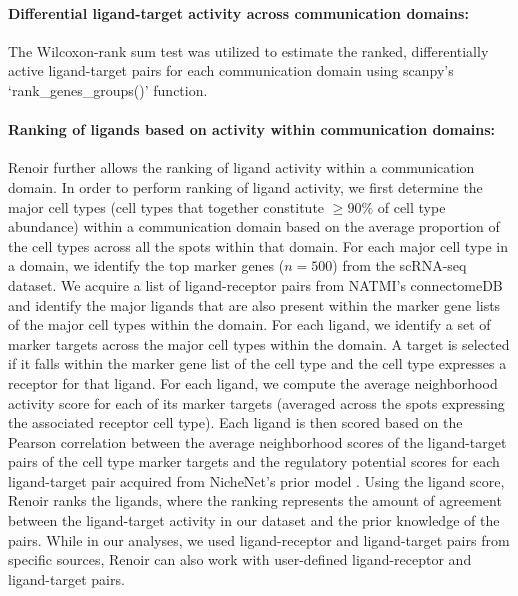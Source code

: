 \paragraph{Differential ligand-target activity across communication domains:} The Wilcoxon-rank sum test was utilized to estimate the ranked, differentially active ligand-target pairs for each communication domain using scanpy's `rank\_genes\_groups()' function.

\paragraph{Ranking of ligands based on activity within communication domains:} Renoir further allows the ranking of ligand activity within a communication domain. In order to perform ranking of ligand activity, we first determine the major cell types (cell types that together constitute $\geq 90\%$ of cell type abundance) within a communication domain based on the average proportion of the cell types across all the spots within that domain. For each major cell type in a domain, we identify the top marker genes ($n=500$) from the scRNA-seq dataset. We acquire a list of  ligand-receptor pairs from NATMI's connectomeDB \citep{Hou2020} and identify the major ligands that are also present within the marker gene lists of the major cell types within the domain. For each ligand, we identify a set of marker targets across the major cell types within the domain. A target is selected if it falls within the marker gene list of the cell type and the cell type expresses a receptor for that ligand. For each ligand, we compute the average neighborhood activity score for each of its marker targets (averaged across the spots expressing the associated receptor cell type). Each ligand is then scored based on the Pearson correlation between the average neighborhood scores of the ligand-target pairs of the cell type marker targets and the regulatory potential scores for each ligand-target pair acquired from NicheNet's prior model \citep{Browaeys2020}. Using the ligand score, Renoir ranks the ligands, where the ranking represents the amount of agreement between the ligand-target activity in our dataset and the prior knowledge of the pairs. While in our analyses, we used ligand-receptor and ligand-target pairs from specific sources, Renoir can also work with user-defined ligand-receptor and ligand-target pairs.
